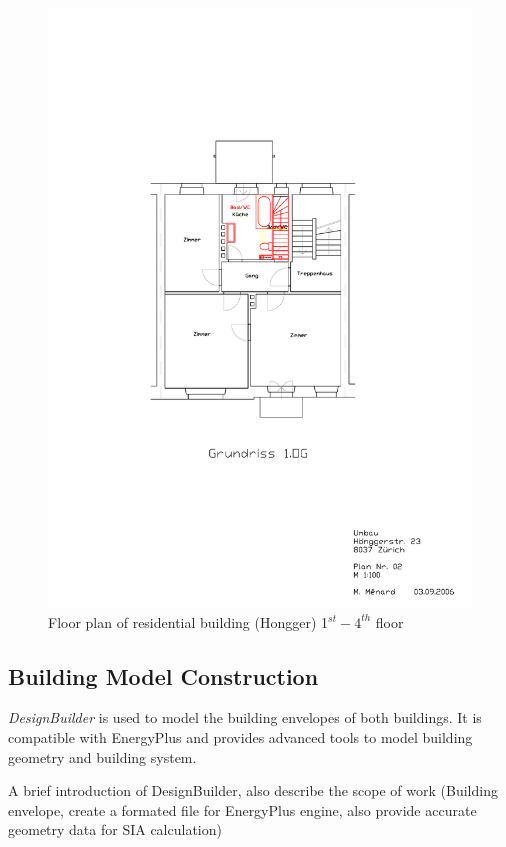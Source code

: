 \documentclass[11pt, a4paper]{article}
\theoremstyle{definition}
\begin{document}
		\begin{figure}[H]
		\centering
		\includegraphics[scale=1.6]{Hongg_1OG_Plan.pdf}
		\caption{Floor plan of residential building (Hongger) 1$^{st} - 4^{th}$ floor}
		\label{fig:hongg_og1_plan}
		\end{figure}


	\subsection{Building Model Construction}
		\textit{DesignBuilder} is used to model the building envelopes of both buildings. It is compatible with EnergyPlus and provides advanced tools to model building geometry and building system.

		A brief introduction of DesignBuilder, also describe the scope of work (Building envelope, create a formated file for EnergyPlus engine, also provide accurate geometry data for SIA calculation)
		
\end{document}
